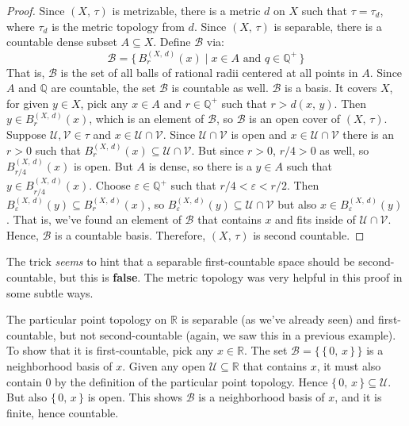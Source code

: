\documentclass{article}
\theoremstyle{plain}
\theoremstyle{normal}
\newenvironment{example}{%
    \pushQED{\qed}\renewcommand{\qedsymbol}{$\blacksquare$}\examplex%
}{%
    \popQED\endexamplex%
}
\begin{document}
        \begin{proof}
            Since $(X,\,\tau)$ is metrizable, there is a metric $d$ on $X$
            such that $\tau=\tau_{d}$, where $\tau_{d}$ is the metric topology
            from $d$. Since $(X,\,\tau)$ is separable, there is a countable
            dense subset $A\subseteq{X}$. Define $\mathcal{B}$ via:
            \begin{equation}
                \mathcal{B}=
                \{\,B_{r}^{(X,\,d)}(x)\;|\;
                    x\in{A}\textrm{ and }q\in\mathbb{Q}^{+}\,\}
            \end{equation}
            That is, $\mathcal{B}$ is the set of all balls of rational radii
            centered at all points in $A$. Since $A$ and $\mathbb{Q}$ are
            countable, the set $\mathcal{B}$ is countable as well.
            $\mathcal{B}$ is a basis. It covers $X$, for given $y\in{X}$,
            pick any $x\in{A}$ and $r\in\mathbb{Q}^{+}$ such that
            $r>d(x,\,y)$. Then $y\in{B}_{r}^{(X,\,d)}(x)$, which is an element
            of $\mathcal{B}$, so $\mathcal{B}$ is an open cover of $(X,\,\tau)$.
            Suppose $\mathcal{U},\mathcal{V}\in\tau$ and
            $x\in\mathcal{U}\cap\mathcal{V}$. Since $\mathcal{U}\cap\mathcal{V}$
            is open and $x\in\mathcal{U}\cap\mathcal{V}$ there is an
            $r>0$ such that
            $B_{r}^{(X,\,d)}(x)\subseteq\mathcal{U}\cap\mathcal{V}$. But since
            $r>0$, $r/4>0$ as well, so $B_{r/4}^{(X,\,d)}(x)$ is open. But
            $A$ is dense, so there is a $y\in{A}$ such that
            $y\in{B}_{r/4}^{(X,\,d)}(x)$. Choose
            $\varepsilon\in\mathbb{Q}^{+}$ such that $r/4<\varepsilon<r/2$.
            Then $B_{\varepsilon}^{(X,\,d)}(y)\subseteq{B}_{r}^{(X,\,d)}(x)$,
            so $B_{\varepsilon}^{(X,\,d)}(y)\subseteq\mathcal{U}\cap\mathcal{V}$
            but also $x\in{B}_{\varepsilon}^{(X,\,d)}(y)$. That is, we've found
            an element of $\mathcal{B}$ that contains $x$ and fits inside of
            $\mathcal{U}\cap\mathcal{V}$. Hence, $\mathcal{B}$ is a countable
            basis. Therefore, $(X,\,\tau)$ is second countable.
        \end{proof}
        The trick \textit{seems} to hint that a separable first-countable space
        should be second-countable, but this is \textbf{false}. The metric
        topology was very helpful in this proof in some subtle ways.
        \begin{example}
            The particular point topology on $\mathbb{R}$ is separable
            (as we've already seen) and first-countable, but not
            second-countable (again, we saw this in a previous example). To
            show that it is first-countable, pick any $x\in\mathbb{R}$. The
            set $\mathcal{B}=\big\{\,\{\,0,\,x\,\}\,\big\}$ is a neighborhood
            basis of $x$. Given any open $\mathcal{U}\subseteq\mathbb{R}$ that
            contains $x$, it must also contain $0$ by the definition of the
            particular point topology. Hence
            $\{\,0,\,x\,\}\subseteq\mathcal{U}$. But also
            $\{\,0,\,x\,\}$ is open. This shows $\mathcal{B}$ is a
            neighborhood basis of $x$, and it is finite, hence countable.
        \end{example}
\end{document}
